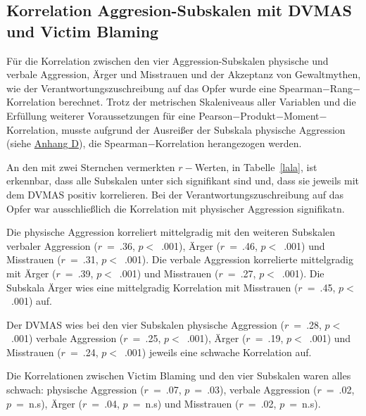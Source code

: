 

\subsection{Korrelation Aggresion-Subskalen mit DVMAS und Victim Blaming}  \label{subsec_4.4.1}
Für die Korrelation zwischen den vier Aggression-Subskalen physische und verbale Aggression, Ärger und Misstrauen und der Akzeptanz von Gewaltmythen, wie der Verantwortungszuschreibung auf das Opfer wurde eine Spearman$-$Rang$-$Korrelation berechnet. Trotz der metrischen Skaleniveaus aller Variablen und die Erfüllung weiterer Voraussetzungen für eine Pearson$-$Produkt$-$Moment$-$Korrelation, musste aufgrund der Ausreißer der Subskala physische Aggression (siehe \hyperref[Boxplot_phAggro]{Anhang D}), die Spearman$-$Korrelation herangezogen werden.

An den mit zwei Sternchen vermerkten $r-$Werten, in Tabelle~\ref{lala}, ist erkennbar, dass alle Subskalen unter sich signifikant sind und, dass sie jeweils mit dem DVMAS positiv korrelieren. Bei der Verantwortungszuschreibung auf das Opfer war ausschließlich die Korrelation mit physischer Aggression signifikatn.


Die physische Aggression korreliert mittelgradig mit den weiteren Subskalen verbaler Aggression ($r$~=~.36, $p<$~.001), Ärger ($r$~=~.46, $p<$~.001) und Misstrauen ($r$~=~.31, $p<$~.001).
Die verbale Aggression korrelierte mittelgradig mit Ärger ($r$~=~.39, $p<$~.001) und Misstrauen ($r$~=~.27, $p<$~.001).
Die Subskala Ärger wies eine mittelgradig Korrelation mit Misstrauen ($r$~=~.45, $p<$~.001) auf.

Der DVMAS wies bei den vier Subskalen physische Aggression ($r$~=~.28, $p<$~.001) verbale Aggression ($r$~=~.25, $p<$~.001), Ärger ($r$~=~.19, $p<$~.001) und Misstrauen ($r$~=~.24, $p<$~.001) jeweils eine schwache Korrelation auf.

Die Korrelationen zwischen Victim Blaming und den vier Subskalen waren alles schwach: physische Aggression ($r$~=~.07, $p$~=~.03), verbale Aggression ($r$~=~.02, $p$~=~n.s), Ärger ($r$~=~.04, $p$~=~n.s) und Misstrauen ($r$~=~.02, $p$~=~n.s).

